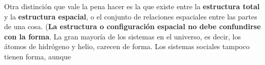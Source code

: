 {Otra distinción que vale la pena hacer es la que existe entre la \textbf{estructura total} y la \textbf{estructura espacial}, o el conjunto de relaciones espaciales entre las partes de una cosa. (\textbf{La estructura o configuración espacial no debe confundirse con la forma}. La gran mayoría de los sistemas en el universo, es decir, los átomos de hidrógeno y helio, carecen de forma. Los sistemas sociales tampoco tienen forma, aunque
}